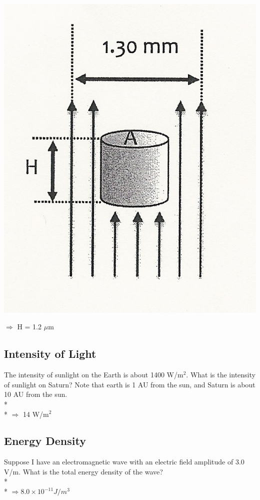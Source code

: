 \documentclass[11pt]{article}
\begin{document}
\begin{center}
\includegraphics[scale=0.2]{Images/radiation_pressure.jpg}
\end{center}

$\Rightarrow$ H = 1.2 $\mu$m

\subsection{Intensity of Light}
The intensity of sunlight on the Earth is about 1400 W/m$^2$.  What is the intensity of sunlight on Saturn?  Note that earth is 1 AU from the sun, and Saturn is about 10 AU from the sun. \\* \\*
$\Rightarrow$ 14 W/m$^2$

\subsection{Energy Density}
Suppose I have an electromagnetic wave with an electric field amplitude of 3.0 V/m.  What is the total energy density of the wave? \\* \\*
$\Rightarrow 8.0 \times 10^{-11} J/m^3$
\end{document}
